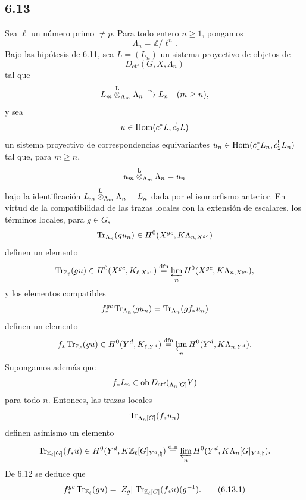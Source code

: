\subsection*{6.13}
Sea $\ell$ un número primo $\ne p$. Para todo entero $n\ge1$, pongamos
\[
\Lambda_n=\mathbb Z/\ell^n.
\]
Bajo las hipótesis de 6.11, sea $L=(L_n)$ un sistema proyectivo de objetos de
\[
D_{\mathrm{ctf}}(G,X,\Lambda_n)
\]
tal que
\[
L_m\overset{\mathrm L}{\otimes}_{\Lambda_m}\Lambda_n\xrightarrow{\sim}L_n\quad (m\ge n),
\]
y sea
\[
u\in\operatorname{Hom}(c_1^*L,c_2^!L)
\]
un sistema proyectivo de correspondencias equivariantes $u_n\in\operatorname{Hom}(c_1^*L_n,c_2^!L_n)$ tal que, para $m\ge n$,
\[
u_m\overset{\mathrm L}{\otimes}_{\Lambda_m}\Lambda_n=u_n
\]
bajo la identificación $L_m\overset{\mathrm L}{\otimes}_{\Lambda_m}\Lambda_n=L_n$ dada por el isomorfismo anterior. En virtud de la compatibilidad de las trazas locales con la extensión de escalares, los términos locales, para $g\in G$,
\[
\operatorname{Tr}_{\Lambda_n}(gu_n)\in H^0(X^{gc},K\Lambda_{n,X^{gc}})
\]
definen un elemento
\[
\operatorname{Tr}_{\mathbb Z_{\ell}}(gu)\in
H^0(X^{gc},K_{\ell,X^{gc}})
\stackrel{\mathrm{dfn}}{=}
\varprojlim_n H^0(X^{gc},K\Lambda_{n,X^{gc}}),
\]
y los elementos compatibles
\[
f_*^{gc}\operatorname{Tr}_{\Lambda_n}(gu_n)=\operatorname{Tr}_{\Lambda_n}(gf_*u_n)
\]
definen un elemento
\[
f_*\operatorname{Tr}_{\mathbb Z_{\ell}}(gu)\in
H^0(Y^d,K_{\ell,Y^d})
\stackrel{\mathrm{dfn}}{=}
\varprojlim_n H^0(Y^d,K\Lambda_{n,Y^d}).
\]
Supongamos además que
\[
f_*L_n\in\operatorname{ob} D_{\mathrm{ctf}}({}_{\Lambda_n[G]}Y)
\]
para todo $n$. Entonces, las trazas locales
\[
\operatorname{Tr}_{\Lambda_n[G]}(f_*u_n)
\]
definen asimismo un elemento
\[
\operatorname{Tr}_{\mathbb Z_{\ell}[G]}(f_*u)\in
H^0(Y^d,K\mathbb Z_{\ell}[G]_{Y^d,\natural})
\stackrel{\mathrm{dfn}}{=}
\varprojlim_n H^0(Y^d,K\Lambda_n[G]_{Y^d,\natural}).
\]
De 6.12 se deduce que
\begin{equation}
f_*^{gc}\operatorname{Tr}_{\mathbb Z_{\ell}}(gu)
=
|Z_g|\,\operatorname{Tr}_{\mathbb Z_{\ell}[G]}(f_*u)(g^{-1}).
\tag{6.13.1}
\end{equation}
